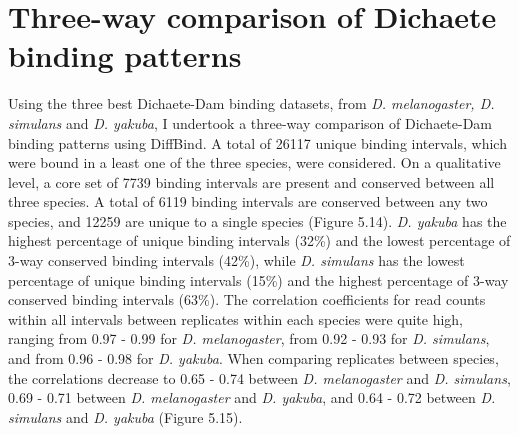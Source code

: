 \section{Three-way comparison of Dichaete binding patterns}
Using the three best Dichaete-Dam binding datasets, from \emph{D. melanogaster, D. simulans} and \emph{D. yakuba}, I undertook a three-way comparison of Dichaete-Dam binding patterns using DiffBind. A total of 26117 unique binding intervals, which were bound in a least one of the three species, were considered. On a qualitative level, a core set of 7739 binding intervals are present and conserved between all three species. A total of 6119 binding intervals are conserved between any two species, and 12259 are unique to a single species (Figure 5.14). \emph{D. yakuba} has the highest percentage of unique binding intervals (32\%) and the lowest percentage of 3-way conserved binding intervals (42\%), while \emph{D. simulans} has the lowest percentage of unique binding intervals (15\%) and the highest percentage of 3-way conserved binding intervals (63\%). The correlation coefficients for read counts within all intervals between replicates within each species were quite high, ranging from 0.97 - 0.99 for \emph{D. melanogaster}, from 0.92 - 0.93 for \emph{D. simulans}, and from 0.96 - 0.98 for \emph{D. yakuba}. When comparing replicates between species, the correlations decrease to 0.65 - 0.74 between \emph{D. melanogaster} and \emph{D. simulans}, 0.69 - 0.71 between \emph{D. melanogaster} and \emph{D. yakuba}, and 0.64 - 0.72 between \emph{D. simulans} and \emph{D. yakuba} (Figure 5.15).\\


